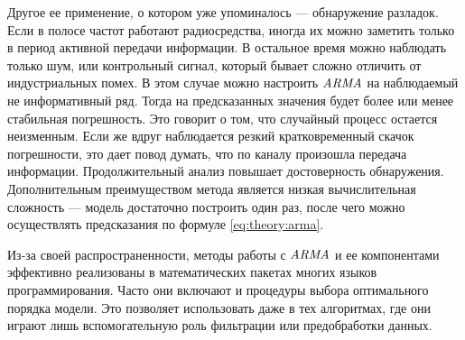 Другое ее применение, о котором уже упоминалось --- обнаружение разладок. Если в полосе частот работают радиосредства, иногда их можно заметить только в период активной передачи информации. В остальное время можно наблюдать только шум, или контрольный сигнал, который бывает сложно отличить от индустриальных помех. В этом случае можно настроить $\mathit{ARMA}$ на наблюдаемый не информативный ряд. Тогда на предсказанных значения будет более или менее стабильная погрешность. Это говорит о том, что случайный процесс остается неизменным. Если же вдруг наблюдается резкий кратковременный скачок погрешности, это дает повод думать, что по каналу произошла передача информации. Продолжительный анализ повышает достоверность обнаружения. Дополнительным преимуществом метода является низкая вычислительная сложность --- модель достаточно построить один раз, после чего можно осуществлять предсказания по формуле \ref{eq:theory:arma}.

Из-за своей распространенности, методы работы с $\mathit{ARMA}$ и ее компонентами эффективно реализованы в математических пакетах многих языков программирования. Часто они включают и процедуры выбора оптимального порядка модели. Это позволяет использовать даже в тех алгоритмах, где они играют лишь вспомогательную роль фильтрации или предобработки данных.
